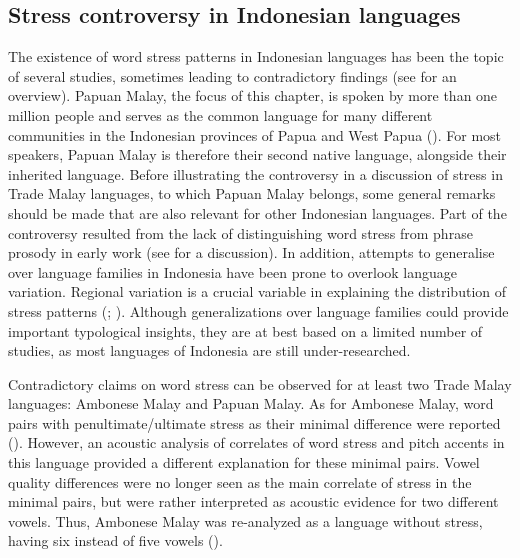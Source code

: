 \subsection{Stress controversy in Indonesian languages}
The existence of word stress patterns in Indonesian languages has been the topic of several studies, sometimes leading to contradictory findings (see \citealt{goedemans_stress_2007} for an overview). Papuan Malay, the focus of this chapter, is spoken by more than one million people and serves as the common language for many different communities in the Indonesian provinces of Papua and West Papua (\citealt{kluge_grammar_2017}). For most speakers, Papuan Malay is therefore their second native language, alongside their inherited language. Before illustrating the controversy in a discussion of stress in Trade Malay languages, to which Papuan Malay belongs, some general remarks should be made that are also relevant for other Indonesian languages. Part of the controversy resulted from the lack of distinguishing word stress from phrase prosody in early work (see \citealt{goedemans_stress_2007} for a discussion). In addition, attempts to generalise over language families in Indonesia have been prone to overlook language variation. Regional variation is a crucial variable in explaining the distribution of stress patterns (\citealt{goedemans_stress_2007}; \citealt{himmelmann_austronesia_2020}). Although generalizations over language families could provide important typological insights, they are at best based on a limited number of studies, as most languages of Indonesia are still under-researched.\par

Contradictory claims on word stress can be observed for at least two Trade Malay languages: Ambonese Malay and Papuan Malay. As for Ambonese Malay, word pairs with penultimate/ultimate stress as their minimal difference were reported (\citealt{vanminde_malayu_1997}). However, an acoustic analysis of correlates of word stress and pitch accents in this language provided a different explanation for these minimal pairs. Vowel quality differences were no longer seen as the main correlate of stress in the minimal pairs, but were rather interpreted as acoustic evidence for two different vowels. Thus, Ambonese Malay was re-analyzed as a language without stress, having six instead of five vowels (\citealt{maskikit-essed_no_2016}).\par

